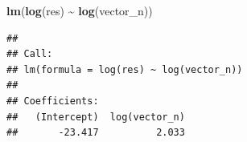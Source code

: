 \documentclass[
]{article}
\newenvironment{Shaded}{\begin{snugshade}}{\end{snugshade}}
\newcommand{\FunctionTok}[1]{\textcolor[rgb]{0.13,0.29,0.53}{\textbf{#1}}}
\newcommand{\NormalTok}[1]{#1}
\newcommand{\SpecialCharTok}[1]{\textcolor[rgb]{0.81,0.36,0.00}{\textbf{#1}}}
\begin{document}
\begin{Shaded}
\begin{Highlighting}[]
\FunctionTok{lm}\NormalTok{(}\FunctionTok{log}\NormalTok{(res) }\SpecialCharTok{\textasciitilde{}} \FunctionTok{log}\NormalTok{(vector\_n))}
\end{Highlighting}
\end{Shaded}

\begin{verbatim}
## 
## Call:
## lm(formula = log(res) ~ log(vector_n))
## 
## Coefficients:
##   (Intercept)  log(vector_n)  
##       -23.417          2.033
\end{verbatim}
\end{document}
